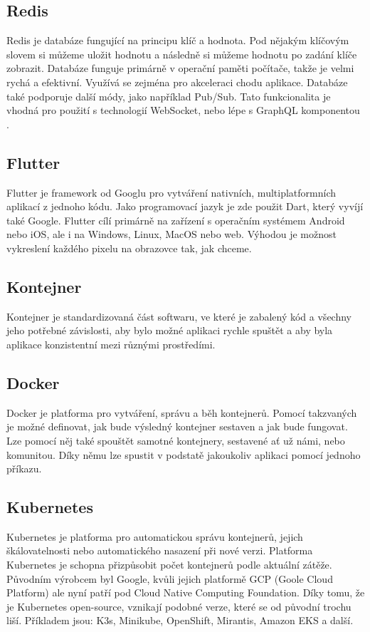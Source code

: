 \subsection{Redis}
Redis je databáze fungující na principu klíč a hodnota. Pod nějakým klíčovým slovem si můžeme uložit hodnotu a následně si můžeme hodnotu po zadání klíče zobrazit. Databáze funguje primárně v operační paměti počítače, takže je velmi rychá a efektivní. Využívá se zejména pro akceleraci chodu aplikace. Databáze také podporuje další módy, jako například Pub/Sub\cite{PubSub}. Tato funkcionalita je vhodná pro použití s technologií WebSocket, nebo lépe s GraphQL komponentou .

\subsection{Flutter}
Flutter je framework od Googlu pro vytváření nativních, multiplatformních aplikací z jednoho kódu. \cite{Flutter} Jako programovací jazyk je zde použit Dart, který vyvíjí také Google. Flutter cílí primárně na zařízení s operačním systémem Android nebo iOS, ale i na Windows, Linux, MacOS nebo web. Výhodou je možnost vykreslení každého pixelu na obrazovce tak, jak chceme.

\subsection{Kontejner}
Kontejner je standardizovaná část softwaru, ve které je zabalený kód a všechny jeho potřebné závislosti, aby bylo možné aplikaci rychle spuštět a aby byla aplikace konzistentní mezi různými prostředími. \cite{Kontejner}

\subsection{Docker}
Docker je platforma pro vytváření, správu a běh kontejnerů. Pomocí takzvaných  je možné definovat, jak bude výsledný kontejner sestaven a jak bude fungovat. Lze pomocí něj také spouštět samotné kontejnery, sestavené ať už námi, nebo komunitou. Díky němu lze spustit v podstatě jakoukoliv aplikaci pomocí jednoho příkazu.

\subsection{Kubernetes}
Kubernetes je platforma pro automatickou správu kontejnerů, jejich škálovatelnosti nebo automatického nasazení při nové verzi. Platforma Kubernetes je schopna přizpůsobit počet kontejnerů podle aktuální zátěže. 
Původním výrobcem byl Google, kvůli jejich platformě GCP (Goole Cloud Platform) ale nyní patří pod Cloud Native Computing Foundation. Díky tomu, že je Kubernetes open-source, vznikají podobné verze, které se od původní trochu liší. Příkladem jsou: K3s, Minikube, OpenShift, Mirantis, Amazon EKS a další.


